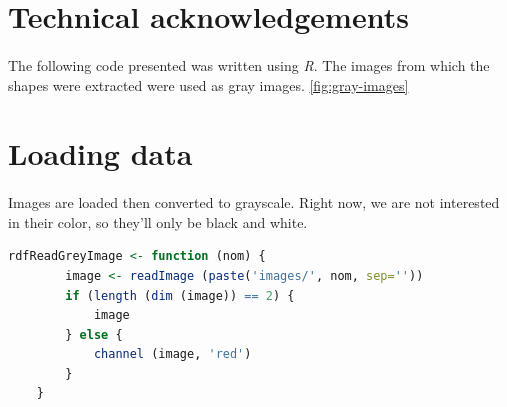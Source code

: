 \section{Technical acknowledgements}
\paragraph{}
The following code presented was written using \emph{R}. The images from which the shapes were extracted were used as gray images. \ref{fig:gray-images}

\section{Loading data}
\paragraph{}
Images are loaded then converted to grayscale. Right now, we are not interested in their color, so they'll only be black and white.

\begin{lstlisting}[language=R, caption=Loading images in R]
    rdfReadGreyImage <- function (nom) {
        image <- readImage (paste('images/', nom, sep=''))
        if (length (dim (image)) == 2) {
            image
        } else {
            channel (image, 'red')
        }
    }
\end{lstlisting}

